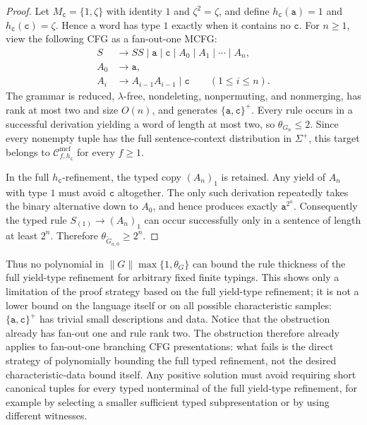 \documentclass[11pt]{article}
\numberwithin{equation}{section}
\theoremstyle{plain}
\theoremstyle{definition}
\theoremstyle{remark}
\newcommand{\Cmcf}[2]{\mathcal{C}^{\mathrm{mcf}}_{#1,#2}}
\begin{document}
\begin{proof}
Let $M_{\mathtt c}=\{1,\zeta\}$ with identity $1$ and $\zeta^2=\zeta$, and define
$h_{\mathtt c}(\mathtt a)=1$ and $h_{\mathtt c}(\mathtt c)=\zeta$.  Hence a word has type $1$ exactly
when it contains no $\mathtt c$.  For $n\ge1$, view the following CFG as a
fan-out-one MCFG:
\[
\begin{aligned}
 S&\to SS\mid \mathtt a\mid \mathtt c\mid A_0\mid A_1\mid\cdots\mid A_n,\\
 A_0&\to \mathtt a,\\
 A_i&\to A_{i-1}A_{i-1}\mid \mathtt c\qquad(1\le i\le n).
\end{aligned}
\]
The grammar is reduced, $\lambda$-free, nondeleting, nonpermuting, and
nonmerging, has rank at most two and size $O(n)$, and generates
$\{\mathtt a,\mathtt c\}^+$.  Every rule occurs in a successful derivation yielding a word of
length at most two, so $\theta_{G_n}\le2$.  Since every nonempty tuple has the
full sentence-context distribution in $\Sigma^+$, this target belongs to
$\Cmcf{f}{h_{\mathtt c}}$ for every $f\ge1$.

In the full $h_{\mathtt c}$-refinement, the typed copy $(A_n)_1$ is retained.  Any yield
of $A_n$ with type $1$ must avoid $\mathtt c$ altogether.  The only such
derivation repeatedly takes the binary alternative down to $A_0$, and hence
produces exactly $\mathtt a^{2^n}$.  Consequently the typed rule
$S_{(1)}\to (A_n)_1$ can occur successfully only in a sentence of length at
least $2^n$.  Therefore
$\theta_{\widetilde G_{n,0}}\ge2^n$.
\end{proof}

Thus no polynomial in $\|G\|\max\{1,\theta_G\}$ can bound the rule
thickness of the full yield-type refinement for arbitrary fixed finite typings.
This shows only a limitation of the proof strategy based on the full
yield-type refinement; it is not a lower bound on the language itself or on all
possible characteristic samples:
$\{\mathtt a,\mathtt c\}^+$ has trivial small descriptions and data.  Notice
that the obstruction already has fan-out one and rule rank two.  The obstruction therefore already applies to fan-out-one branching CFG
presentations: what fails is the direct strategy of polynomially bounding the
full typed refinement, not the desired characteristic-data bound itself.  Any positive solution must avoid requiring
short canonical tuples for every typed nonterminal of the full yield-type refinement, for
example by selecting a smaller sufficient typed subpresentation or by using
different witnesses.
\end{document}

